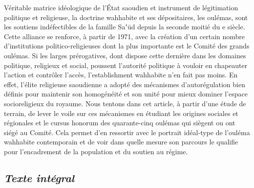 Véritable matrice idéologique de l'État saoudien et instrument de
légitimation politique et religieuse, la doctrine wahhabite et ses
dépositaires, les oulémas, sont les soutiens indéfectibles de la famille
Sa‛ūd depuis la seconde moitié du e siècle. Cette alliance se renforce,
à partir de 1971, avec la création d'un certain nombre d'institutions
politico-religieuses dont la plus importante est le Comité des grands
oulémas. Si les larges prérogatives, dont dispose cette dernière dans
les domaines politique, religieux et social, poussent l'autorité
politique à vouloir en chapeauter l'action et contrôler l'accès,
l'establishment wahhabite n'en fait pas moins. En effet, l'élite
religieuse saoudienne a adopté des mécanismes d'autorégulation bien
définis pour maintenir son homogénéité et son unité pour mieux dominer
l'espace socioreligieux du royaume. Nous tentons dans cet article, à
partir d'une étude de terrain, de lever le voile sur ces mécanismes en
étudiant les origines sociales et régionales et le cursus honorum des
quarante-cinq oulémas qui siègent ou ont siégé au Comité. Cela permet
d'en ressortir avec le portrait idéal-type de l'ouléma wahhabite
contemporain et de voir dans quelle mesure son parcours le qualifie pour
l'encadrement de la population et du soutien au régime.

\hypertarget{texte-intuxe9gral}{%
\subsection{\texorpdfstring{\emph{Texte
intégral}}{Texte intégral}}\label{texte-intuxe9gral}}

